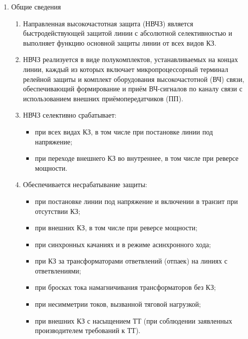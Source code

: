 \color{black}

\begin{enumerate}

\item Общие сведения

\begin{enumerate}

\item
Направленная высокочастотная защита (НВЧЗ) является быстродействующей защитой линии с абсолютной селективностью и выполняет функцию основной защиты линии от всех видов КЗ. 

\item
НВЧЗ реализуется в виде полукомплектов, устанавливаемых на концах линии, каждый из которых включает микропроцессорный терминал релейной защиты и комплект оборудования высокочастотной (ВЧ) связи, обеспечивающий формирование и приём ВЧ-сигналов по каналу связи с использованием внешних приёмопередатчиков (ПП).

\item 
НВЧЗ селективно срабатывает:
\begin{itemize}
    \item при всех видах КЗ, в том числе при постановке линии под напряжение; 
    \item при переходе внешнего КЗ во внутреннее, в том числе при реверсе мощности.
\end{itemize}

\item 
Обеспечивается несрабатывание защиты:
\begin{itemize} 
\item при постановке линии под напряжение и включении в транзит при отсутствии КЗ;
\item при внешних КЗ, в том числе при реверсе мощности;
\item при синхронных качаниях и в режиме асинхронного хода;
\item при КЗ за трансформаторами ответвлений (отпаек) на линиях с ответвлениями;
\item при бросках тока намагничивания трансформаторов без КЗ;
\item при несимметрии токов, вызванной тяговой нагрузкой;
\item при внешних КЗ с насыщением ТТ (при соблюдении заявленных производителем требований к ТТ).
\end{itemize}


\end{enumerate}
\end{enumerate}
